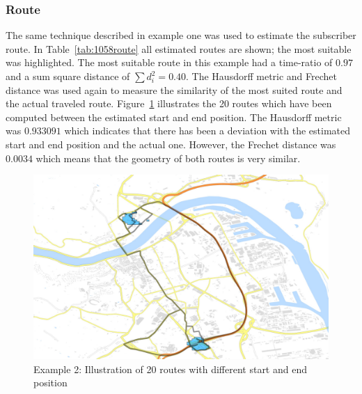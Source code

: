 \documentclass[master,english]{hgbthesis}
\begin{document}
\subsubsection{Route}
The same technique described in example one was used to estimate the subscriber route. In Table~\ref{tab:1058route} all estimated routes are shown; the most suitable was highlighted. The most suitable route in this example  had a time-ratio of  $0.97$ and a sum square distance of $\sum {d}_{i}^{2}=0.40$. The Hausdorff metric and Frechet distance was used again to measure the similarity of the most suited route and the actual traveled route. Figure~\ref{fig:1058_routes} illustrates the 20 routes which have been computed between the estimated start and end position. The Hausdorff metric was $0.933091$ which indicates that there has been a deviation with the estimated start and end position and the actual one. However, the Frechet distance was  $0.0034$ which means that the geometry of both routes is very similar.
\begin{figure}
\centering
\includegraphics[width=0.7\linewidth]{./images/1058_routes}
\caption{Example 2: Illustration of 20 routes with different start and end position}
\label{fig:1058_routes}
\end{figure}
\end{document}
